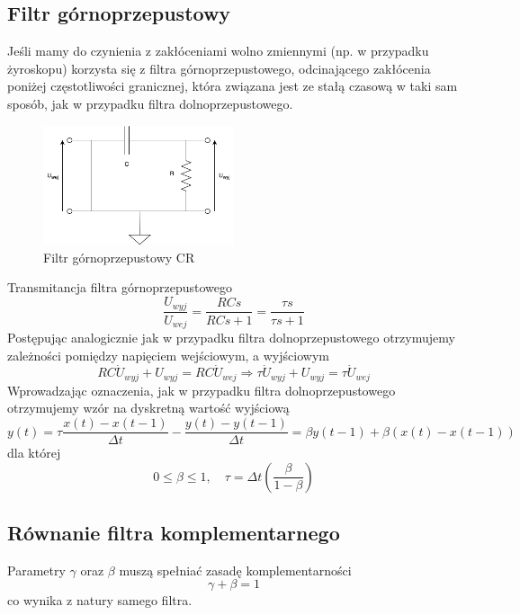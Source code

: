 \subsection{Filtr górnoprzepustowy}

Jeśli mamy do czynienia z zakłóceniami wolno zmiennymi (np. w przypadku żyroskopu) korzysta się z filtra górnoprzepustowego, odcinającego zakłócenia poniżej częstotliwości granicznej, która związana jest ze stałą czasową w taki sam sposób, jak w przypadku filtra dolnoprzepustowego.
$$
$$

\begin{figure}[htb!]
    \centering
    \includegraphics[width=0.5\textwidth]{Rysunki/Rozdzial04/FIltr_gornoprzepustowy.png}
    \caption{Filtr górnoprzepustowy CR}
    \label{filtr gp}
\end{figure}

Transmitancja filtra górnoprzepustowego
$$
    \frac{U_{wyj}}{U_{wej}} = \frac{RCs}{RCs + 1} = \frac{\tau s}{\tau s + 1}
$$
Postępując analogicznie jak w przypadku filtra dolnoprzepustowego otrzymujemy zależności pomiędzy napięciem wejściowym, a wyjściowym
$$
   RC\Dot{U}_{wyj} + U_{wyj} = RC\Dot{U}_{wej} \Rightarrow \tau\Dot{U}_{wyj} + U_{wyj} = \tau\Dot{U}_{wej} 
$$
Wprowadzając oznaczenia, jak w przypadku filtra dolnoprzepustowego otrzymujemy wzór na dyskretną wartość wyjściową
\begin{equation}
    y(t) = \tau\frac{x(t) - x(t-1)}{\Delta t} - \frac{y(t) - y(t-1)}{\Delta t}  = \beta y(t-1) + \beta(x(t) - x(t-1))
    \label{wyjscie gp}
\end{equation}
dla której
$$
    0 \leq \beta \leq 1,
    \quad
    \tau = \Delta t\left(\frac{\beta}{1 - \beta}\right)
$$

\subsection{Równanie filtra komplementarnego}
Parametry $\gamma$ oraz $\beta$ muszą spełniać zasadę komplementarności
$$
    \gamma + \beta = 1
$$
co wynika z natury samego filtra.

